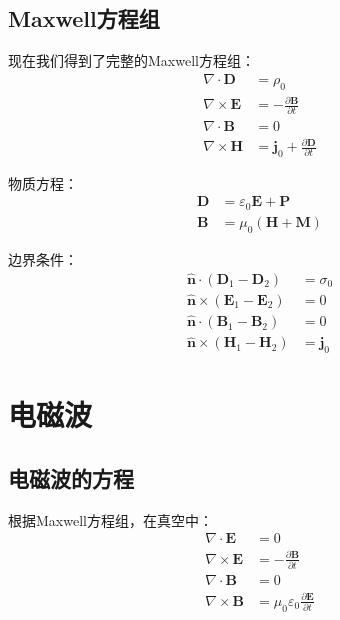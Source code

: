 \documentclass[12pt,onecolumn,a4paper]{book}
\numberwithin{table}{subsection}
\numberwithin{equation}{subsection}
\begin{document}
    \subsection{Maxwell方程组}
    现在我们得到了完整的Maxwell方程组：
    \begin{align}
        \nabla \cdot \mathbf{D}  & = \rho_0                                                \\
        \nabla \times \mathbf{E} & = - \frac{\partial \mathbf{B}}{\partial t}              \\
        \nabla \cdot \mathbf{B}  & = 0                                                     \\
        \nabla \times \mathbf{H} & = \mathbf{j}_0 + \frac{\partial \mathbf{D}}{\partial t}
    \end{align}

    物质方程：
    \begin{align}
        \mathbf{D} & = \varepsilon_0 \mathbf{E} + \mathbf{P} \\
        \mathbf{B} & = \mu_0 (\mathbf{H} + \mathbf{M})
    \end{align}

    边界条件：
    \begin{align}
        \hat{\mathbf{n}}\cdot(\mathbf{D}_1- \mathbf{D}_2)  & = \sigma_0     \\
        \hat{\mathbf{n}}\times(\mathbf{E}_1- \mathbf{E}_2) & = 0            \\
        \hat{\mathbf{n}}\cdot(\mathbf{B}_1- \mathbf{B}_2)  & = 0            \\
        \hat{\mathbf{n}}\times(\mathbf{H}_1- \mathbf{H}_2) & = \mathbf{j}_0
    \end{align}

    \section{电磁波}

    \subsection{电磁波的方程}
    根据Maxwell方程组，在真空中：
    \begin{align}
        \nabla \cdot \mathbf{E}  & = 0                                                          \\
        \nabla \times \mathbf{E} & = - \frac{\partial \mathbf{B}}{\partial t}                   \\
        \nabla \cdot \mathbf{B}  & = 0                                                          \\
        \nabla \times \mathbf{B} & = \mu_0 \varepsilon_0 \frac{\partial \mathbf{E}}{\partial t}
    \end{align}
\end{document}

